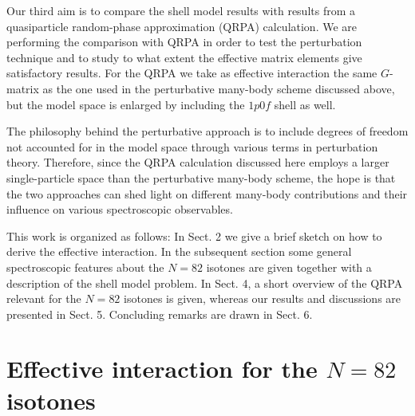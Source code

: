 Our third aim is to compare the shell model results with results from a
quasiparticle random-phase approximation (QRPA) calculation.
We are performing the comparison with QRPA in order to test the perturbation
technique and to study to what extent the effective matrix elements give 
satisfactory results.
For the QRPA we take  as effective interaction the same $G$-matrix 
as the one used in the perturbative many-body scheme discussed above,
but the model space is enlarged by including the 
$1p0f$ shell as well.

The philosophy behind the perturbative approach 
is to include degrees of freedom 
not accounted for in the model space through 
various terms in perturbation theory. 
Therefore, since the QRPA calculation discussed here employs a larger 
single-particle 
space than the perturbative many-body scheme, 
the hope is that the two approaches 
can shed light on different many-body contributions and 
their influence on various 
spectroscopic observables.

This work is organized as follows:
In Sect. 2 we give a brief sketch on how to derive the effective interaction.
In the subsequent section some general spectroscopic features about the 
$N=82$ isotones are given together with a 
description of the shell model problem.
In Sect. 4, a short overview of the QRPA 
relevant for the $N=82$ isotones is given, 
whereas our results and discussions are presented in Sect. 5.
Concluding remarks are drawn in Sect. 6.



\section{Effective interaction for the $N=82$ isotones}

